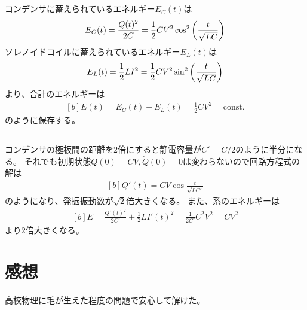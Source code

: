 \documentclass[../ap_2014.tex]{subfiles}
\begin{document}
\subsection{}
コンデンサに蓄えられているエネルギー\(E_C(t)\)は
\begin{equation}\begin{aligned}[b]
    E_C(t) = \frac{Q(t)^2}{2C}=\frac{1}{2}CV^2\cos^2\qty(\frac{t}{\sqrt{LC}})
\end{aligned}\end{equation}
ソレノイドコイルに蓄えられているエネルギー\(E_L(t)\)は
\begin{equation}\begin{aligned}[b]
    E_L(t) = \frac{1}{2}LI^2=\frac{1}{2}CV^2\sin^2\qty(\frac{t}{\sqrt{LC}})
\end{aligned}\end{equation}
より、合計のエネルギーは
\begin{equation}\begin{aligned}[b]
    E(t)=E_C(t)+E_L(t) = \frac{1}{2}CV^2=\text{const.}
\end{aligned}\end{equation}
のように保存する。

\subsection{}
コンデンサの極板間の距離を2倍にすると静電容量が\(C'=C/2\)のように半分になる。
それでも初期状態\(Q(0)=CV,\dot{Q}(0)=0\)は変わらないので回路方程式の解は
\begin{equation}\begin{aligned}[b]
    Q'(t) = CV\cos\frac{t}{\sqrt{LC'}}
\end{aligned}\end{equation}
のようになり、発振振動数が\(\sqrt{2}\)倍大きくなる。
また、系のエネルギーは
\begin{equation}\begin{aligned}[b]
    E = \frac{Q'(t)^2}{2C'}+\frac{1}{2}LI'(t)^2 = \frac{1}{2C'}C^2V^2=CV^2
\end{aligned}\end{equation}
より2倍大きくなる。

\section*{感想}
高校物理に毛が生えた程度の問題で安心して解けた。
\end{document}
